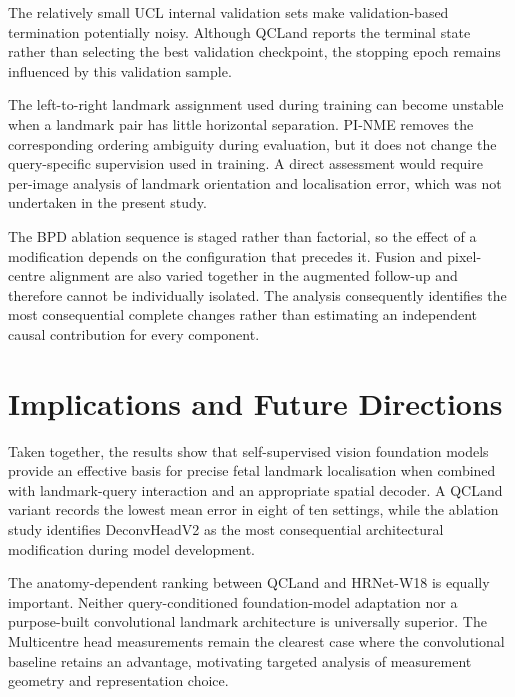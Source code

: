 The relatively small UCL internal validation sets make
validation-based termination potentially noisy. Although QCLand
reports the terminal state rather than selecting the best validation
checkpoint, the stopping epoch remains influenced by this validation
sample.

The left-to-right landmark assignment used during training can become
unstable when a landmark pair has little horizontal separation.
PI-NME removes the corresponding ordering ambiguity during evaluation,
but it does not change the query-specific supervision used in
training. A direct assessment would require per-image analysis of
landmark orientation and localisation error, which was not undertaken
in the present study.

The BPD ablation sequence is staged rather than factorial, so the
effect of a modification depends on the configuration that precedes
it. Fusion and pixel-centre alignment are also varied together in the
augmented follow-up and therefore cannot be individually isolated.
The analysis consequently identifies the most consequential complete
changes rather than estimating an independent causal contribution for
every component.



\section{Implications and Future Directions}
\label{sec:discussion-implications}
\label{sec:discussion-eomt-suitability}

Taken together, the results show that self-supervised vision
foundation models provide an effective basis for precise fetal
landmark localisation when combined with landmark-query interaction
and an appropriate spatial decoder. A QCLand variant records the
lowest mean error in eight of ten settings, while the ablation study
identifies DeconvHeadV2 as the most consequential architectural
modification during model development.

The anatomy-dependent ranking between QCLand and HRNet-W18 is equally
important. Neither query-conditioned foundation-model adaptation nor
a purpose-built convolutional landmark architecture is universally
superior. The Multicentre head measurements remain the clearest case
where the convolutional baseline retains an advantage, motivating
targeted analysis of measurement geometry and representation choice.

